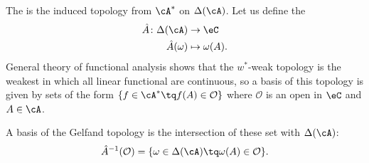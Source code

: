 The  is the induced topology from $\cA^*$ on $\Delta(\cA)$. Let us define the 
        \begin{equation}
        \begin{aligned}
            \hat A \colon \Delta(\cA) &\to \eC\\
            \hat A(\omega)&\mapsto \omega(A).
        \end{aligned}
    \end{equation}  
General theory of functional analysis shows that the $w^*$-weak topology is the weakest in which all linear functional are continuous, so a basis of this topology is given by sets of the form $\{f\in\cA^*\tq f(A)\in\mathcal{O}\}$ where $\mathcal{O}$ is an open in $\eC$ and $A\in\cA$.

A basis of the Gelfand topology is the intersection of these set with $\Delta(\cA)$:
\begin{equation}
  \hat A^{-1}(\mathcal{O})=\{\omega\in\Delta(\cA)\tq \omega(A)\in\mathcal{O}\}.
\end{equation}

%
%




